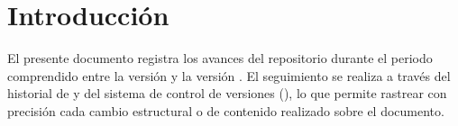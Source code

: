 
\section{Introducción}
\label{sec:introduccion}

%

El presente documento registra los avances del repositorio \texttt{\NombreRepo}
durante el periodo comprendido entre la versión \texttt{\VerRef} y la versión
\texttt{\VerActual}. El seguimiento se realiza a través del historial de
 y  del sistema de control de versiones
(), lo que permite rastrear con precisión cada cambio estructural
o de contenido realizado sobre el documento.

